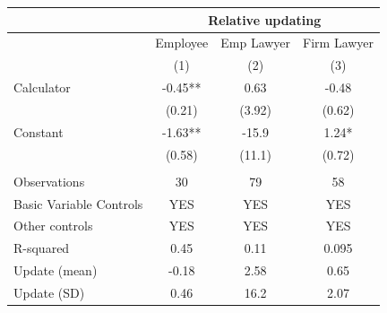 \begin{tabular}{lccc}
\toprule
      & \multicolumn{3}{c}{Relative updating} \\
\midrule
\midrule
      & Employee & Emp Lawyer & Firm Lawyer \\
\midrule
      & (1)   & (2)   & (3) \\
\midrule
\midrule
Calculator & -0.45** & 0.63  & -0.48 \\
      & (0.21) & (3.92) & (0.62) \\
Constant  & -1.63** & -15.9 & 1.24* \\
      & (0.58) & (11.1) & (0.72) \\
      &       &       &  \\
\midrule
Observations & 30    & 79    & 58 \\
Basic Variable Controls  & YES   & YES   & YES \\
Other controls & YES   & YES   & YES \\
R-squared & 0.45  & 0.11  & 0.095 \\
Update (mean) & -0.18 & 2.58  & 0.65 \\
Update (SD) & 0.46  & 16.2  & 2.07 \\
\bottomrule
\bottomrule
\end{tabular}%
